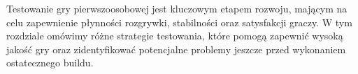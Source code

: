 Testowanie gry pierwszoosobowej jest kluczowym etapem rozwoju, mającym na celu zapewnienie płynności rozgrywki, stabilności oraz satysfakcji graczy. W tym rozdziale omówimy różne strategie testowania, które pomogą zapewnić wysoką jakość gry oraz zidentyfikować potencjalne problemy jeszcze przed wykonaniem ostatecznego buildu.